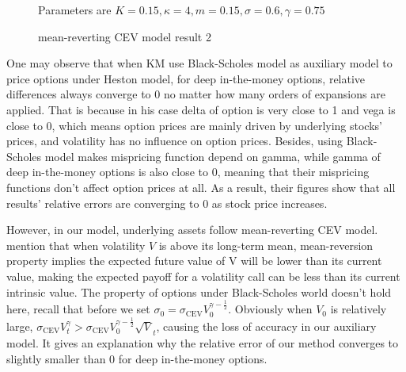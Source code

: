 \begin{figure}[t]
  \hfill
  \caption{mean-reverting CEV model result 2}
  \small{Parameters are $K=0.15, \kappa=4, m=0.15, \sigma=0.6, \gamma=0.75$}
  \label{mrcev res2}
\end{figure}

One may observe that when KM use Black-Scholes model as auxiliary model to price options under Heston model, for deep in-the-money options, relative differences always converge to 0 no matter how many orders of expansions are applied. That is because in his case delta of option is very close to 1 and vega is close to 0, which means option prices are mainly driven by underlying stocks' prices, and volatility has no influence on option prices. Besides, using Black-Scholes model makes mispricing function depend on gamma, while gamma of deep in-the-money options is also close to 0, meaning that their mispricing functions don't affect option prices at all. As a result, their figures show that all results' relative errors are converging to 0 as stock price increases.

However, in our model, underlying assets follow mean-reverting CEV model. \cite{grunbichler_valuing_1996} mention that when volatility $V$ is above its long-term mean, mean-reversion property implies the expected future value of V will be lower than its current value, making the expected payoff for a volatility call can be less than its current intrinsic value. The property of options under Black-Scholes world doesn't hold here, recall that before we set $\sigma_0 = \sigma_{\text{CEV}}V_0^{\gamma-\frac{1}{2}}$. Obviously when $V_0$ is relatively large, $\sigma_{\text{CEV}} V^{\gamma}_t > \sigma_{\text{CEV}}V_0^{\gamma-\frac{1}{2}} \sqrt{V}_t$, causing the loss of accuracy in our auxiliary model. It gives an explanation why the relative error of our method converges to slightly smaller than 0 for deep in-the-money options. 

